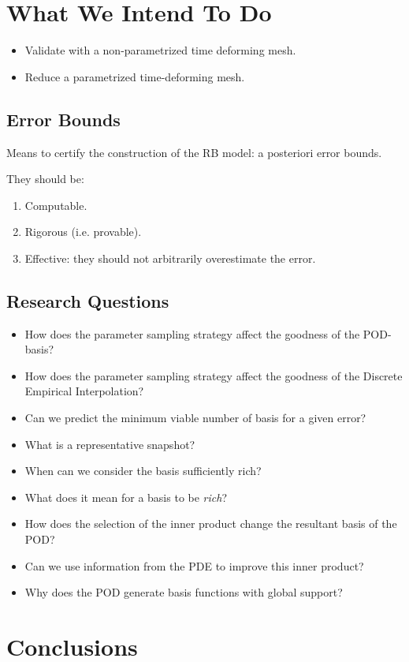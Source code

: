 \documentclass[../main.tex]{subfiles}
\begin{document}
\section{What We Intend To Do}

\begin{itemize}
    \item Validate with a non-parametrized time deforming mesh.
    \item Reduce a parametrized time-deforming mesh.
\end{itemize}

\subsection{Error Bounds}
Means to certify the construction of the RB model: a posteriori error bounds.

They should be:
\begin{enumerate}
    \item Computable.
    \item Rigorous (i.e. provable).
    \item Effective: they should not arbitrarily overestimate the error.
\end{enumerate}

\subsection{Research Questions}

\begin{itemize}
    \item How does the parameter sampling strategy affect the goodness of the POD-basis?
    \item How does the parameter sampling strategy affect the goodness of the Discrete Empirical Interpolation?
    \item Can we predict the minimum viable number of basis for a given error?
    \item What is a representative snapshot?
    \item When can we consider the basis sufficiently rich?
    \item What does it mean for a basis to be \textit{rich}? 
    \item How does the selection of the inner product change the resultant basis of the POD?
    \item Can we use information from the PDE to improve this inner product?
    \item Why does the POD generate basis functions with global support? 
\end{itemize}

\section{Conclusions}
\label{sec:conclusions}

\newpage
\printbibliography
\end{document}
